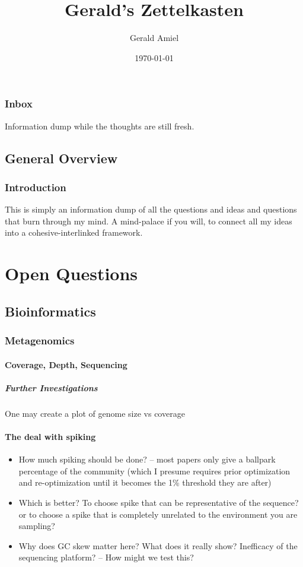 \documentclass[11.5pt]{report}
\title{Gerald's Zettelkasten}
\author{Gerald Amiel}
\date{\today}
\begin{document}
	
	\maketitle
	\tableofcontents
	\listoffigures
	\listoftables
	
	\newpage

\section*{Inbox}
Information dump while the thoughts are still fresh. 

\chapter*{General Overview}
\section*{Introduction}

This is simply an information dump of all the questions and ideas and questions that burn through my mind. A mind-palace if you will, to connect all my ideas into a cohesive-interlinked framework.  

\part{Open Questions}
\pagestyle{fancy}
\setlength{\headheight}{14pt}
\rhead{}
\lhead{}
\cfoot{\thepage}
\setcounter{page}{1} 
\chapter{Bioinformatics}
\section{Metagenomics}
\subsection{Coverage, Depth, Sequencing}
\subsubsection{Further Investigations}
One may create a plot of genome size vs coverage 
\subsection{The deal with spiking}
\begin{itemize}
	\item How much spiking should be done? -- most papers only give a ballpark percentage of the community (which I presume requires prior optimization and re-optimization until it becomes the 1\% threshold they are after)
	\item Which is better? To choose spike that can be representative of the sequence? or to choose a spike that is completely unrelated to the environment you are sampling?
	\item Why does GC skew matter here? What does it really show? Inefficacy of the sequencing platform? -- How might we test this?
\end{itemize}
\end{document}
